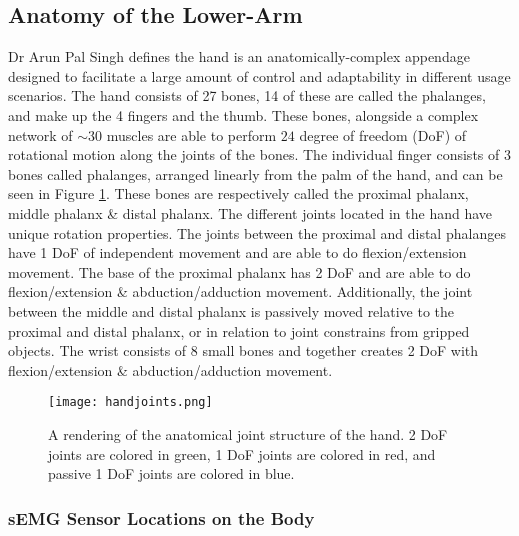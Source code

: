 \documentclass[../main.tex]{subfiles}
\begin{document}
\subsection{Anatomy of the Lower-Arm}
\label{sec:anatomy}

Dr Arun Pal Singh \cite{anatomy} defines the hand is an anatomically-complex appendage designed to facilitate a large amount of control and adaptability in different usage scenarios.
The hand consists of 27 bones, 14 of these are called the \gls{phalanges}, and make up the 4 fingers and the thumb.
These bones, alongside a complex network of $\sim30$ muscles are able to perform $24$ degree of freedom (DoF) of rotational motion along the joints of the bones.
The individual finger consists of 3 bones called \gls{phalanges}, arranged linearly from the palm of the hand, and can be seen in Figure \ref{fig:anatomy}.
These bones are respectively called the \gls{proximal phalanx}, \gls{middle phalanx} \& \gls{distal phalanx}.
The different joints located in the hand have unique rotation properties.
The joints between the proximal and distal phalanges have 1 DoF of independent movement and are able to do \gls{flexion/extension} movement.
The base of the proximal phalanx has 2 DoF and are able to do \gls{flexion/extension} \& \gls{abduction/adduction} movement.
Additionally, the joint between the middle and distal phalanx is passively moved relative to the proximal and distal phalanx, or in relation to joint constrains from gripped objects.
The wrist consists of 8 small bones and together creates 2 DoF with \gls{flexion/extension} \& \gls{abduction/adduction} movement.


\begin{figure}[H]
\begin{center}
\texttt{[image: handjoints.png]}
\caption{A rendering of the anatomical joint structure of the hand. 2 DoF joints are colored in green, 1 DoF joints are colored in red, and passive 1 DoF joints are colored in blue.}
\label{fig:anatomy}
\end{center}
\end{figure}

\subsubsection{sEMG Sensor Locations on the Body}
\label{sec:muscleplacements}
\end{document}
